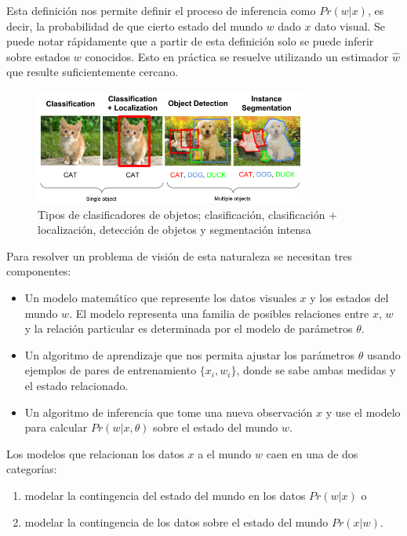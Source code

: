 \documentclass[letter,12pt]{report}
\begin{document}
Esta definición nos permite definir el proceso de inferencia como $Pr(w|x)$, es decir, la
probabilidad de que cierto estado del mundo $w$ dado $x$ dato visual. Se puede notar
rápidamente que a partir de esta definición solo se puede inferir sobre estados $w$
conocidos. Esto en práctica se resuelve utilizando un estimador $\hat{w}$ que resulte
suficientemente cercano.

\begin{figure}[H]
    \centering
    \includegraphics[width=0.8\textwidth]{obclass}
    \caption{Tipos de clasificadores de objetos; clasificación, clasificación +
    localización, detección de objetos y segmentación intensa}
    \label{fig:obclass}
\end{figure}

Para resolver un problema de visión de esta naturaleza se necesitan tres componentes:
\begin{itemize}
    \item Un modelo matemático que represente los datos visuales $x$ y los estados del
        mundo $w$. El modelo representa una familia de posibles relaciones entre $x$, 
        $w$ y la relación particular es determinada por el modelo de parámetros $\theta$.
    \item Un algoritmo de aprendizaje que nos permita ajustar los parámetros $\theta$
        usando ejemplos de pares de entrenamiento $\{x_i, w_i\}$, donde se sabe ambas
        medidas y el estado relacionado.
    \item Un algoritmo de inferencia que tome una nueva observación $x$ y use el modelo
        para calcular $Pr(w|x, \theta)$ sobre el estado del mundo $w$.
\end{itemize}

Los modelos que relacionan los datos $x$ a el mundo $w$ caen en una de dos categorías:
\begin{enumerate}
    \item modelar la contingencia del estado del mundo en los datos $Pr(w|x)$ o
    \item modelar la contingencia de los datos sobre el estado del mundo $Pr(x|w)$.
\end{enumerate}
\end{document}
